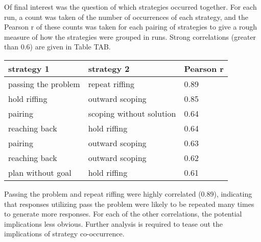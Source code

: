 Of final interest was the question of which strategies occurred together. For each run, a count was taken of the number of occurrences of each strategy, and the Pearson r of these counts was taken for each pairing of strategies to give a rough measure of how the strategies were grouped in runs. Strong correlations (greater than 0.6) are given in Table TAB.

\begin{table}
    \begin{tabular}{l l l}
        \textbf{strategy 1} & \textbf{strategy 2} & \textbf{Pearson r} \\
        \hline
        passing the problem & repeat riffing & 0.89 \\
        hold riffing & outward scoping & 0.85 \\
        pairing & scoping without solution & 0.64 \\
        reaching back & hold riffing & 0.64 \\
        pairing & outward scoping & 0.63 \\
        reaching back & outward scoping & 0.62 \\
        plan without goal & hold riffing & 0.61 \\
    \end{tabular}
\end{table}

Passing the problem and repeat riffing were highly correlated (0.89), indicating that responses utilizing pass the problem were likely to be repeated many times to generate more responses. For each of the other correlations, the potential implications less obvious. Further analysis is required to tease out the implications of strategy co-occurrence.

